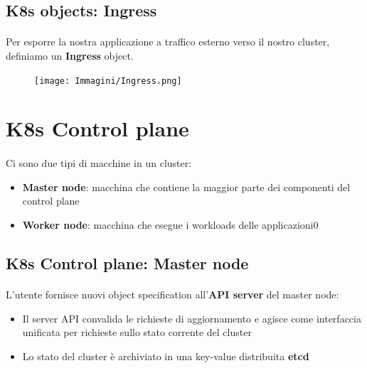 \documentclass[a4paper, 12pt]{report}
\begin{document}
          \subsection{K8s objects: Ingress}
          \paragraph{}Per esporre la nostra applicazione a traffico esterno verso il nostro cluster, definiamo un \textbf{Ingress} object.
          \begin{figure}[h]
            \centering
            \texttt{[image: Immagini/Ingress.png]}
          \end{figure}
          \section{K8s Control plane}
          \paragraph{}Ci sono due tipi di macchine in un cluster:
          \begin{itemize}
            \item \textbf{Master node}: macchina che contiene la maggior parte dei componenti del control plane
            \item \textbf{Worker node}: macchina che esegue i workloads delle applicazioni0
          \end{itemize}
          \subsection{K8s Control plane: Master node}
          \paragraph{}L'utente fornisce nuovi object specification all'\textbf{API server} del master node:
          \begin{itemize}
            \item Il server API convalida le richieste di aggiornamento e agisce come interfaccia unificata per richieste sullo stato corrente del cluster
            \item Lo stato del cluster è archiviato in una key-value distribuita \textbf{etcd}
          \end{itemize}
\end{document}

